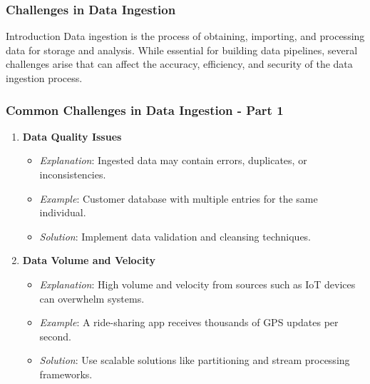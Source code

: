 \documentclass[aspectratio=169]{beamer}
\begin{document}
\begin{frame}[fragile]
    \frametitle{Challenges in Data Ingestion}
    \begin{block}{Introduction}
        Data ingestion is the process of obtaining, importing, and processing data for storage and analysis. While essential for building data pipelines, several challenges arise that can affect the accuracy, efficiency, and security of the data ingestion process.
    \end{block}
\end{frame}

\begin{frame}[fragile]
    \frametitle{Common Challenges in Data Ingestion - Part 1}
    \begin{enumerate}
        \item \textbf{Data Quality Issues}
            \begin{itemize}
                \item \textit{Explanation}: Ingested data may contain errors, duplicates, or inconsistencies.
                \item \textit{Example}: Customer database with multiple entries for the same individual.
                \item \textit{Solution}: Implement data validation and cleansing techniques.
            \end{itemize}
        \item \textbf{Data Volume and Velocity}
            \begin{itemize}
                \item \textit{Explanation}: High volume and velocity from sources such as IoT devices can overwhelm systems.
                \item \textit{Example}: A ride-sharing app receives thousands of GPS updates per second.
                \item \textit{Solution}: Use scalable solutions like partitioning and stream processing frameworks.
            \end{itemize}
    \end{enumerate}
\end{frame}
\end{document}
